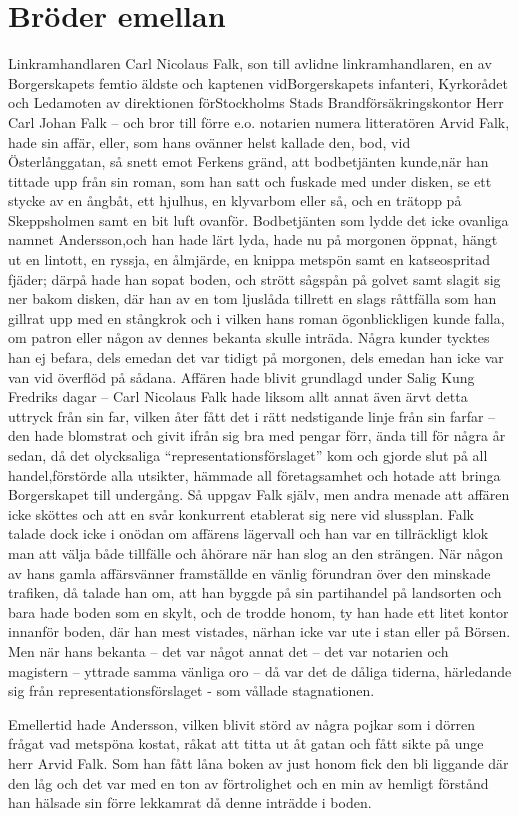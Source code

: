 \documentclass[%
	11pt,			%
	swedish,		%
	]{article}
\begin{document}
\section{Bröder emellan}
Linkramhandlaren Carl Nicolaus Falk, son till avlidne linkramhandlaren, en av 
Borgerskapets femtio äldste och kaptenen vidBorgerskapets infanteri, Kyrkorådet 
och Ledamoten av direktionen förStockholms Stads Brandförsäkringskontor Herr 
Carl Johan Falk -- och bror till förre e.o. notarien numera litteratören Arvid 
Falk, hade sin affär, eller, som hans ovänner helst kallade den, bod, vid 
Österlånggatan, så snett emot Ferkens gränd, att bodbetjänten kunde,när han 
tittade upp från sin roman, som han satt och fuskade med under disken, se ett 
stycke av en ångbåt, ett hjulhus, en klyvarbom eller så, och en trätopp på 
Skeppsholmen samt en bit luft ovanför. Bodbetjänten som lydde det icke ovanliga 
namnet Andersson,och han hade lärt lyda, hade nu på morgonen öppnat, hängt ut 
en lintott, en ryssja, en ålmjärde, en knippa metspön samt en katseospritad 
fjäder; därpå hade han sopat boden, och strött sågspån på golvet samt slagit 
sig ner bakom disken, där han av en tom ljuslåda tillrett en slags råttfälla 
som han gillrat upp med en stångkrok och i vilken hans roman ögonblickligen 
kunde falla, om patron eller någon av dennes bekanta skulle inträda. Några 
kunder tycktes han ej befara, dels emedan det var tidigt på morgonen, dels 
emedan han icke var van vid överflöd på sådana. Affären hade blivit grundlagd 
under Salig Kung Fredriks dagar -- Carl Nicolaus Falk hade liksom allt annat 
även ärvt detta uttryck från sin far, vilken åter fått det i rätt nedstigande 
linje från sin farfar -- den hade blomstrat och givit ifrån sig bra med pengar 
förr, ända till för några år sedan, då det olycksaliga 
``representationsförslaget'' kom och gjorde slut på all handel,förstörde alla 
utsikter, hämmade all företagsamhet och hotade att bringa Borgerskapet till 
undergång. Så uppgav Falk själv, men andra menade att affären icke sköttes och 
att en svår konkurrent etablerat sig nere vid slussplan. Falk talade dock icke 
i onödan om affärens lägervall och han var en tillräckligt klok man att välja 
både tillfälle och åhörare när han slog an den strängen. När någon av hans 
gamla affärsvänner framställde en vänlig förundran över den minskade trafiken, 
då talade han om, att han byggde på sin partihandel på landsorten och bara hade 
boden som en skylt, och de trodde honom, ty han hade ett litet kontor innanför 
boden, där han mest vistades, närhan icke var ute i stan eller på Börsen. Men 
när hans bekanta -- det var något annat det -- det var notarien och magistern 
-- yttrade samma vänliga oro -- då var det de dåliga tiderna, härledande sig 
från representationsförslaget - som vållade stagnationen.

Emellertid hade Andersson, vilken blivit störd av några pojkar som i dörren 
frågat vad metspöna kostat, råkat att titta ut åt gatan och fått sikte på unge 
herr Arvid Falk. Som han fått låna boken av just honom fick den bli liggande 
där den låg och det var med en ton av förtrolighet och en min av hemligt 
förstånd han hälsade sin förre lekkamrat då denne inträdde i boden.\\
\end{document}
